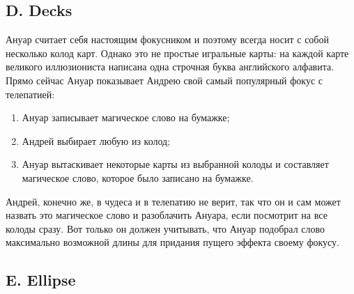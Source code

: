 \subsection*{D. Decks}

Ануар считает себя настоящим фокусником и поэтому всегда носит с собой несколько колод карт. Однако это не простые игральные карты: на каждой карте великого иллюзиониста написана одна строчная буква английского алфавита. Прямо сейчас Ануар показывает Андрею свой самый популярный фокус с телепатией:
\begin{enumerate}
\item Ануар записывает магическое слово на бумажке;
\item Андрей выбирает любую из колод;
\item Ануар вытаскивает некоторые карты из выбранной колоды и составляет магическое слово, которое было записано на бумажке. 
\end{enumerate}
Андрей, конечно же, в чудеса и в телепатию не верит, так что он и сам может назвать это магическое слово и разоблачить Ануара, если посмотрит на все колоды сразу. Вот только он должен учитывать, что Ануар подобрал слово максимально возможной длины для придания пущего эффекта своему фокусу.








\subsection*{E. Ellipse}

